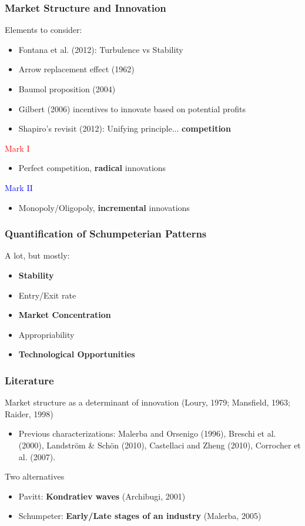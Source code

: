 \documentclass{beamer}
\begin{document}
	\begin{frame}[allowframebreaks]
		\frametitle{Market Structure and Innovation}
		Elements to consider:
		\begin{itemize}
			\item Fontana et al. (2012): Turbulence vs Stability
			\item Arrow replacement effect (1962)
			\item Baumol proposition (2004)
			\item Gilbert (2006) incentives to innovate based on potential profits
			\item Shapiro's revisit (2012): Unifying principle... \textbf{competition}
		\end{itemize}
		\framebreak
		\textcolor{red}{Mark I}
		\begin{itemize}
			\item Perfect competition, \textbf{radical} innovations
		\end{itemize}
		\textcolor{blue}{Mark II}
		\begin{itemize}
			\item Monopoly/Oligopoly, \textbf{incremental} innovations
		\end{itemize}			
	\end{frame}
	\begin{frame}
		\frametitle{Quantification of Schumpeterian Patterns}
		A lot, but mostly:
		\begin{itemize}
			\item \textbf{Stability}
			\item Entry/Exit rate
			\item \textbf{Market Concentration}
			\item Appropriability
			\item \textbf{Technological Opportunities}
		\end{itemize}
	\end{frame}
	\begin{frame}
		\frametitle{Literature}
		Market structure as a determinant of innovation (Loury, 1979; Mansfield, 1963; Raider, 1998)
		\begin{itemize}
			\item Previous characterizations: Malerba and Orsenigo (1996), Breschi et al. (2000), Landström \& Schön (2010), Castellaci and Zheng (2010), Corrocher et al. (2007).
		\end{itemize}
		Two alternatives
		\begin{itemize}
			\item Pavitt: \textbf{Kondratiev waves} (Archibugi, 2001)
			\item Schumpeter: \textbf{Early/Late stages of an industry} (Malerba, 2005)
		\end{itemize}
	\end{frame}
\end{document}
